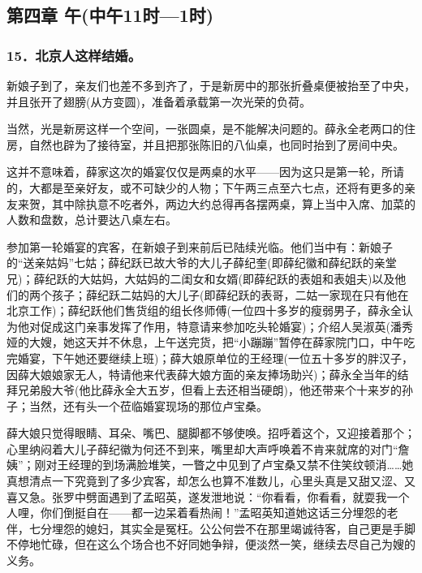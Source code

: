 \subsection*{第四章 午(中午11时—1时)}

\subsubsection*{15．北京人这样结婚。}
\par 新娘子到了，亲友们也差不多到齐了，于是新房中的那张折叠桌便被抬至了中央，并且张开了翅膀(从方变圆)，准备着承载第一次光荣的负荷。
\par 当然，光是新房这样一个空间，一张圆桌，是不能解决问题的。薛永全老两口的住房，自然也辟为了接待室，并且把那张陈旧的八仙桌，也同时抬到了房间中央。
\par 这并不意味着，薛家这次的婚宴仅仅是两桌的水平——因为这只是第一轮，所请的，大都是至亲好友，或不可缺少的人物；下午两三点至六七点，还将有更多的亲友来贺，其中除执意不吃者外，两边大约总得再各摆两桌，算上当中入席、加菜的人数和盘数，总计要达八桌左右。
\par 参加第一轮婚宴的宾客，在新娘子到来前后已陆续光临。他们当中有：新娘子的“送亲姑妈”七姑；薛纪跃已故大爷的大儿子薛纪奎(即薛纪徽和薛纪跃的亲堂兄)；薛纪跃的大姑妈，大姑妈的二闺女和女婿(即薛纪跃的表姐和表姐夫)以及他们的两个孩子；薛纪跃二姑妈的大儿子(即薛纪跃的表哥，二姑一家现在只有他在北京工作)；薛纪跃他们售货组的组长佟师傅(一位四十多岁的瘦弱男子，薛永全认为他对促成这门亲事发挥了作用，特意请来参加吃头轮婚宴)；介绍人吴淑英(潘秀娅的大嫂，她这天并不休息，上午送完货，把“小蹦蹦”暂停在薛家院门口，中午吃完婚宴，下午她还要继续上班)；薛大娘原单位的王经理(一位五十多岁的胖汉子，因薛大娘娘家无人，特请他来代表薛大娘方面的亲友捧场助兴)；薛永全当年的结拜兄弟殷大爷(他比薛永全大五岁，但看上去还相当硬朗)，他还带来个十来岁的孙子；当然，还有头一个莅临婚宴现场的那位卢宝桑。
\par 薛大娘只觉得眼睛、耳朵、嘴巴、腿脚都不够使唤。招呼着这个，又迎接着那个；心里纳闷着大儿子薛纪徽为何还不到来，嘴里却大声呼唤着不肯来就席的对门“詹姨”；刚对王经理的到场满脸堆笑，一瞥之中见到了卢宝桑又禁不住笑纹顿消……她真想清点一下究竟到了多少宾客，却怎么也算不准数儿，心里头真是又甜又涩、又喜又急。张罗中劈面遇到了孟昭英，遂发泄地说：“你看看，你看看，就耍我一个人哩，你们倒挺自在——都一边呆着看热闹！”孟昭英知道她这话三分埋怨的老伴，七分埋怨的媳妇，其实全是冤枉。公公何尝不在那里竭诚待客，自己更是手脚不停地忙碌，但在这么个场合也不好同她争辩，便淡然一笑，继续去尽自己为嫂的义务。
